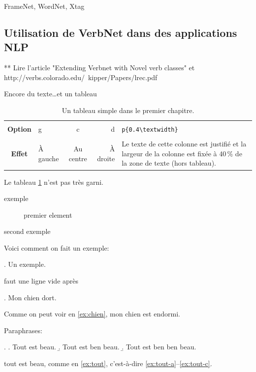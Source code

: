 \documentclass[12pt,maitrise,frenchb,natbib,twoside,initial]{dms}
\numberwithin{equation}{section}
\numberwithin{table}{chapter}
\numberwithin{figure}{chapter}
\begin{document}
FrameNet, WordNet, Xtag

\subsection {Utilisation de VerbNet dans des applications NLP}   

** Lire l'article "Extending Verbnet with Novel verb classes" et http://verbs.colorado.edu/~kipper/Papers/lrec.pdf


Encore du texte\dots et un tableau

\begin{table}[htb]
	\centering
	\caption{Un tableau simple dans le premier chapitre.}
	\label{tab:simple1}
	\begin{tabular}{|c||l|c|r|p{}|}
		\hline			&			&			&			&																															\\
		\textbf{Option}	& g			& c			& d			& \verb|p{0.4\textwidth}|																									\\[3mm]
		\hline\hline	&			&			&			&																															\\
		\textbf{Effet}	& À gauche	& Au centre	& À droite	& Le texte de cette colonne est justifié et la largeur de la colonne est fixée \`a 40\,\% de la zone de texte (hors tableau).	\\[3mm]
		\hline 
	\end{tabular}
\end{table}
Le tableau \ref{tab:simple1} n'est pas tr\`es garni.

\begin{description}
\item [exemple] premier element
\item [second exemple]
\end{description}

Voici comment on fait un exemple:

\ex. Un exemple.

faut une ligne vide après

\ex. \label{ex:chien} Mon chien dort.

Comme on peut voir en \ref{ex:chien}, mon chien est endormi.

\noindent
Paraphrases:

\ex. \label{ex:tout}
  \a. \label{ex:tout-a} Tout est beau.
  \b. \label{ex:tout-b} Tout est ben beau.
  \b. \label{ex:tout-c} Tout est ben ben beau.

tout est beau, comme en \ref{ex:tout}, c'est-à-dire \ref{ex:tout-a}--\ref{ex:tout-c}.
\end{document}
